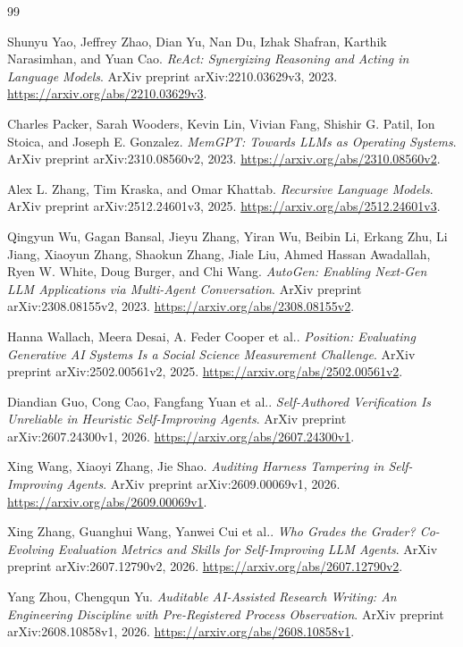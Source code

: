 \documentclass[11pt,a4paper]{article}
\begin{document}
\begin{thebibliography}{99}

Shunyu Yao, Jeffrey Zhao, Dian Yu, Nan Du, Izhak Shafran, Karthik Narasimhan,
and Yuan Cao.
\emph{ReAct: Synergizing Reasoning and Acting in Language Models}.
ArXiv preprint arXiv:2210.03629v3, 2023.
\url{https://arxiv.org/abs/2210.03629v3}.

Charles Packer, Sarah Wooders, Kevin Lin, Vivian Fang, Shishir G. Patil,
Ion Stoica, and Joseph E. Gonzalez.
\emph{MemGPT: Towards LLMs as Operating Systems}.
ArXiv preprint arXiv:2310.08560v2, 2023.
\url{https://arxiv.org/abs/2310.08560v2}.

Alex L. Zhang, Tim Kraska, and Omar Khattab.
\emph{Recursive Language Models}.
ArXiv preprint arXiv:2512.24601v3, 2025.
\url{https://arxiv.org/abs/2512.24601v3}.

Qingyun Wu, Gagan Bansal, Jieyu Zhang, Yiran Wu, Beibin Li, Erkang Zhu,
Li Jiang, Xiaoyun Zhang, Shaokun Zhang, Jiale Liu, Ahmed Hassan Awadallah,
Ryen W. White, Doug Burger, and Chi Wang.
\emph{AutoGen: Enabling Next-Gen LLM Applications via Multi-Agent Conversation}.
ArXiv preprint arXiv:2308.08155v2, 2023.
\url{https://arxiv.org/abs/2308.08155v2}.

Hanna Wallach, Meera Desai, A. Feder Cooper et al..
\emph{Position: Evaluating Generative AI Systems Is a Social Science Measurement Challenge}.
ArXiv preprint arXiv:2502.00561v2, 2025.
\url{https://arxiv.org/abs/2502.00561v2}.

Diandian Guo, Cong Cao, Fangfang Yuan et al..
\emph{Self-Authored Verification Is Unreliable in Heuristic Self-Improving Agents}.
ArXiv preprint arXiv:2607.24300v1, 2026.
\url{https://arxiv.org/abs/2607.24300v1}.

Xing Wang, Xiaoyi Zhang, Jie Shao.
\emph{Auditing Harness Tampering in Self-Improving Agents}.
ArXiv preprint arXiv:2609.00069v1, 2026.
\url{https://arxiv.org/abs/2609.00069v1}.

Xing Zhang, Guanghui Wang, Yanwei Cui et al..
\emph{Who Grades the Grader? Co-Evolving Evaluation Metrics and Skills for Self-Improving LLM Agents}.
ArXiv preprint arXiv:2607.12790v2, 2026.
\url{https://arxiv.org/abs/2607.12790v2}.

Yang Zhou, Chengqun Yu.
\emph{Auditable AI-Assisted Research Writing: An Engineering Discipline with Pre-Registered Process Observation}.
ArXiv preprint arXiv:2608.10858v1, 2026.
\url{https://arxiv.org/abs/2608.10858v1}.


\end{thebibliography}
\end{document}
